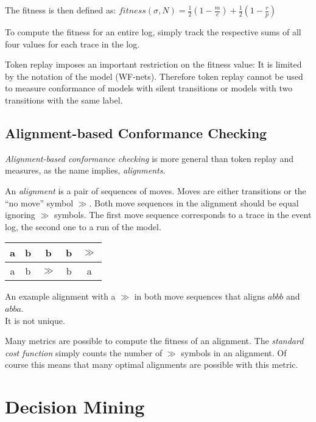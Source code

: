 \documentclass[english]{panikzettel}
\begin{document}
The fitness is then defined as:
$
    fitness(\sigma, N) = \frac{1}{2} \left( 1 - \frac{m}{c} \right) + \frac{1}{2} \left( 1 - \frac{r}{p} \right)
$

To compute the fitness for an entire log, simply track the respective sums of all four values for each trace in the log.

Token replay imposes an important restriction on the fitness value: It is limited by the notation of the model (WF-nets).
Therefore token replay cannot be used to measure conformance of models with silent transitions or models with two transitions with the same label.

\vspace{-0.5\baselineskip}
\subsection{Alignment-based Conformance Checking}

\emph{Alignment-based conformance checking} is more general than token replay and measures, as the name implies, \emph{alignments}.

\begin{halfboxl}
An \emph{alignment} is a pair of sequences of moves.
Moves are either transitions or the ``no move'' symbol $\gg$.
Both move sequences in the alignment should be equal ignoring $\gg$ symbols.
The first move sequence corresponds to a trace in the event log, the second one to a run of the model.
\end{halfboxl}%
\begin{halfboxr}
\vspace{-\baselineskip}
\begin{center}
\begin{tabular}{c|c|c|c|c}
a & b & b & b & $\gg$ \\ \hline
a & b & $\gg$  & b & a
\end{tabular}

An example alignment with a $\gg$ in both move sequences that aligns $abbb$ and $abba$. \\
It is not unique.
\end{center}
\end{halfboxr}

Many metrics are possible to compute the fitness of an alignment.
The \emph{standard cost function} simply counts the number of $\gg$ symbols in an alignment.
Of course this means that many optimal alignments are possible with this metric.

\section{Decision Mining}
\end{document}
